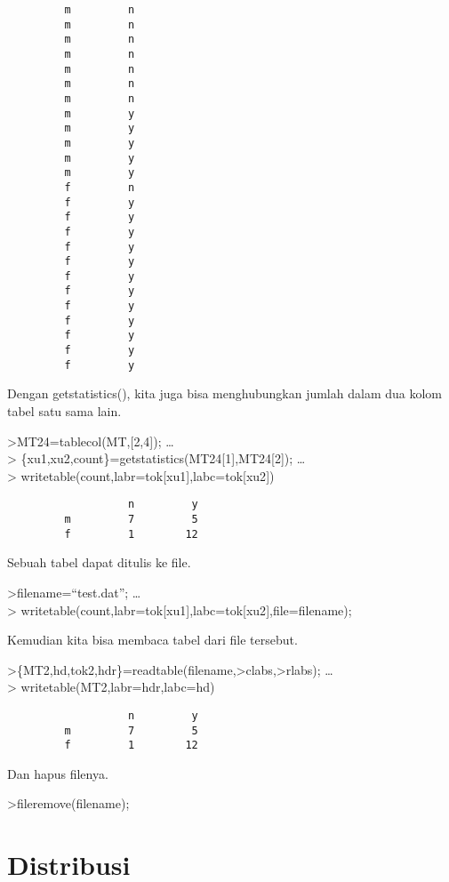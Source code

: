 \documentclass[
]{book}
\begin{document}
\begin{verbatim}
         m         n
         m         n
         m         n
         m         n
         m         n
         m         n
         m         n
         m         y
         m         y
         m         y
         m         y
         m         y
         f         n
         f         y
         f         y
         f         y
         f         y
         f         y
         f         y
         f         y
         f         y
         f         y
         f         y
         f         y
         f         y
\end{verbatim}

Dengan getstatistics(), kita juga bisa menghubungkan jumlah dalam dua kolom tabel satu sama lain.

\textgreater MT24=tablecol(MT,{[}2,4{]}); \ldots{}\\
\textgreater{} \{xu1,xu2,count\}=getstatistics(MT24{[}1{]},MT24{[}2{]}); \ldots{}\\
\textgreater{} writetable(count,labr=tok{[}xu1{]},labc=tok{[}xu2{]})

\begin{verbatim}
                   n         y
         m         7         5
         f         1        12
\end{verbatim}

Sebuah tabel dapat ditulis ke file.

\textgreater filename=``test.dat''; \ldots{}\\
\textgreater{} writetable(count,labr=tok{[}xu1{]},labc=tok{[}xu2{]},file=filename);

Kemudian kita bisa membaca tabel dari file tersebut.

\textgreater\{MT2,hd,tok2,hdr\}=readtable(filename,\textgreater clabs,\textgreater rlabs); \ldots{}\\
\textgreater{} writetable(MT2,labr=hdr,labc=hd)

\begin{verbatim}
                   n         y
         m         7         5
         f         1        12
\end{verbatim}

Dan hapus filenya.

\textgreater fileremove(filename);

\chapter{Distribusi}\label{distribusi}
\end{document}
